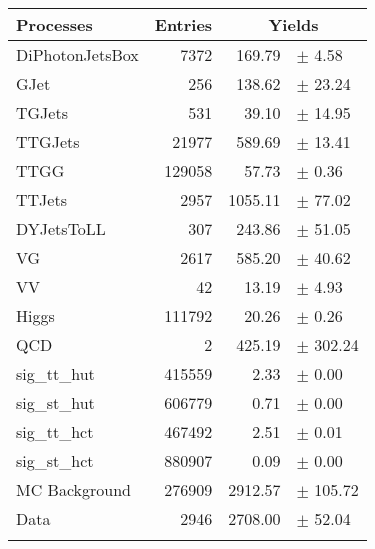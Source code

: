 {\renewcommand{\arraystretch}{1.0}
\begin{center}
\begin{tabular}{lrrl}
\hline\hline
Processes & Entries &\multicolumn{2}{c}{Yields}\\
\hline\hline
DiPhotonJetsBox  & 	            7372 & 	          169.79 & $\pm$ 	       4.58\\
GJet		 & 	             256 & 	          138.62 & $\pm$ 	      23.24\\
TGJets		 & 	             531 & 	           39.10 & $\pm$ 	      14.95\\
TTGJets		 & 	           21977 & 	          589.69 & $\pm$ 	      13.41\\
TTGG		 & 	          129058 & 	           57.73 & $\pm$ 	       0.36\\
TTJets		 & 	            2957 & 	         1055.11 & $\pm$ 	      77.02\\
DYJetsToLL	 & 	             307 & 	          243.86 & $\pm$ 	      51.05\\
VG		 & 	            2617 & 	          585.20 & $\pm$ 	      40.62\\
VV		 & 	              42 & 	           13.19 & $\pm$ 	       4.93\\
Higgs		 & 	          111792 & 	           20.26 & $\pm$ 	       0.26\\
QCD		 & 	               2 & 	          425.19 & $\pm$ 	     302.24\\
sig\_tt\_hut	 & 	          415559 & 	            2.33 & $\pm$ 	       0.00\\
sig\_st\_hut	 & 	          606779 & 	            0.71 & $\pm$ 	       0.00\\
sig\_tt\_hct	 & 	          467492 & 	            2.51 & $\pm$ 	       0.01\\
sig\_st\_hct	 & 	          880907 & 	            0.09 & $\pm$ 	       0.00\\
\hline
MC Background	 & 	          276909 & 	         2912.57 & $\pm$ 	     105.72\\
Data		 & 	            2946 & 	         2708.00 & $\pm$ 	      52.04\\
\hline\hline\\
\end{tabular}
\end{center}
}
